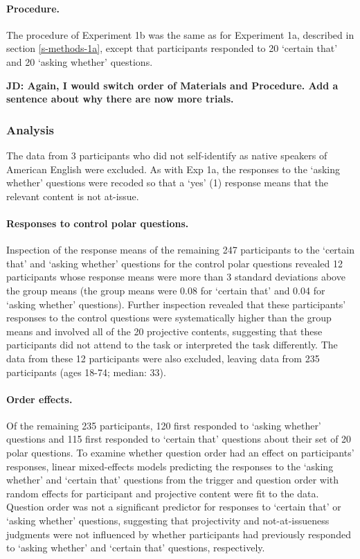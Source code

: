 \documentclass[11pt,fleqn]{article}
\newcommand{\6}{\mbox{$[\hspace*{-.6mm}[$}}
\newcommand{\9}{\mbox{$]\hspace*{-.6mm}]$}}
\begin{document}
\paragraph{Procedure.} The procedure of Experiment 1b was the same as for Experiment 1a, described in section \ref{s-methods-1a}, except that participants responded to 20 `certain that' and 20 `asking whether' questions.

{\bf JD: Again, I would switch order of Materials and Procedure. Add a sentence about why there are now more trials.}

\subsubsection{Analysis}

The data from 3 participants who did not self-identify as native speakers of American English were excluded. As with Exp 1a, the responses to the `asking whether' questions were recoded so that a `yes' (1) response means that the relevant content is not at-issue.

\paragraph{Responses to control polar questions.} 
Inspection of the response means of the remaining 247 participants to the `certain that' and `asking whether' questions for the control polar questions revealed 12 participants whose response means were more than 3 standard deviations above the group means (the group means were 0.08 for `certain that' and 0.04 for `asking whether' questions). Further inspection revealed that these participants' responses to the control questions were systematically higher than the group means and involved all of the 20 projective contents, suggesting that these participants did not attend to the task or interpreted the task differently. The data from these 12 participants were also excluded, leaving data from 235 participants (ages 18-74; median: 33).  

\paragraph{Order effects.} Of the remaining 235 participants, 120 first responded to `asking whether' questions and 115 first responded to `certain that' questions about their set of 20 polar questions. To examine whether question order had an effect on participants' responses, linear mixed-effects models predicting the responses to the `asking whether' and `certain that' questions from the trigger and question order with random effects for participant and projective content were fit to the data. Question order was not a significant predictor for responses to `certain that' or `asking whether' questions, suggesting that projectivity and not-at-issueness judgments were not influenced by whether participants had previously responded to `asking whether' and `certain that' questions, respectively.
\end{document}
